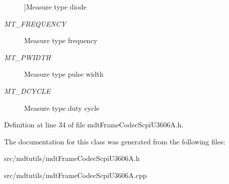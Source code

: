 \begin{Desc}
\begin{description}
{}]Measure type diode \item[{\em 
\hypertarget{classmdt_frame_codec_scpi_u3606_a_a3d7a1de14d77797a08e3d2991fa9f004af5887b3493507cf6c4fed5b140eddca4}{
MT\_\-FREQUENCY}
\label{classmdt_frame_codec_scpi_u3606_a_a3d7a1de14d77797a08e3d2991fa9f004af5887b3493507cf6c4fed5b140eddca4}
}]Measure type frequency \item[{\em 
\hypertarget{classmdt_frame_codec_scpi_u3606_a_a3d7a1de14d77797a08e3d2991fa9f004a37bfcf0b9e141ca60909e9b4a8c05997}{
MT\_\-PWIDTH}
\label{classmdt_frame_codec_scpi_u3606_a_a3d7a1de14d77797a08e3d2991fa9f004a37bfcf0b9e141ca60909e9b4a8c05997}
}]Measure type pulse width \item[{\em 
\hypertarget{classmdt_frame_codec_scpi_u3606_a_a3d7a1de14d77797a08e3d2991fa9f004ae20a6a2d18ef077b65d9060e98ae3b12}{
MT\_\-DCYCLE}
\label{classmdt_frame_codec_scpi_u3606_a_a3d7a1de14d77797a08e3d2991fa9f004ae20a6a2d18ef077b65d9060e98ae3b12}
}]Measure type duty cycle \end{description}
\end{Desc}



Definition at line 34 of file mdtFrameCodecScpiU3606A.h.



The documentation for this class was generated from the following files:\begin{DoxyCompactItemize}
\item 
src/mdtutils/mdtFrameCodecScpiU3606A.h\item 
src/mdtutils/mdtFrameCodecScpiU3606A.cpp\end{DoxyCompactItemize}
